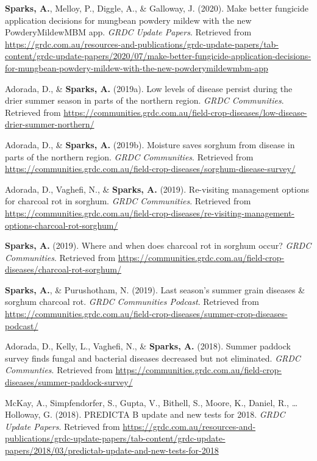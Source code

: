 \documentclass[11pt, a4paper]{awesome-cv}
\begin{document}
\leavevmode\hypertarget{ref-Sparks2020}{}%
\textbf{Sparks, A.}, Melloy, P., Diggle, A., \& Galloway, J. (2020).
Make better fungicide application decisions for mungbean powdery mildew
with the new {PowderyMildewMBM} app. \emph{{GRDC} Update Papers}.
Retrieved from
\url{https://grdc.com.au/resources-and-publications/grdc-update-papers/tab-content/grdc-update-papers/2020/07/make-better-fungicide-application-decisions-for-mungbean-powdery-mildew-with-the-new-powderymildewmbm-app}

\leavevmode\hypertarget{ref-Adorada2019a}{}%
Adorada, D., \& \textbf{Sparks, A.} (2019a). Low levels of disease
persist during the drier summer season in parts of the northern region.
\emph{GRDC Communities}. Retrieved from
\url{https://communities.grdc.com.au/field-crop-diseases/low-disease-drier-summer-northern/}

\leavevmode\hypertarget{ref-Adorada2019b}{}%
Adorada, D., \& \textbf{Sparks, A.} (2019b). Moisture saves sorghum from
disease in parts of the northern region. \emph{GRDC Communities}.
Retrieved from
\url{https://communities.grdc.com.au/field-crop-diseases/sorghum-disease-survey/}

\leavevmode\hypertarget{ref-Adorada2019c}{}%
Adorada, D., Vaghefi, N., \& \textbf{Sparks, A.} (2019). Re-visiting
management options for charcoal rot in sorghum. \emph{GRDC Communities}.
Retrieved from
\url{https://communities.grdc.com.au/field-crop-diseases/re-visiting-management-options-charcoal-rot-sorghum/}

\leavevmode\hypertarget{ref-Sparks2019a}{}%
\textbf{Sparks, A.} (2019). Where and when does charcoal rot in sorghum
occur? \emph{GRDC Communities}. Retrieved from
\url{https://communities.grdc.com.au/field-crop-diseases/charcoal-rot-sorghum/}

\leavevmode\hypertarget{ref-Sparks2019b}{}%
\textbf{Sparks, A.}, \& Purushotham, N. (2019). Last season's summer
grain diseases \& sorghum charcoal rot. \emph{GRDC Communities Podcast}.
Retrieved from
\url{https://communities.grdc.com.au/field-crop-diseases/summer-crop-diseases-podcast/}

\leavevmode\hypertarget{ref-Adorada2019d}{}%
Adorada, D., Kelly, L., Vaghefi, N., \& \textbf{Sparks, A.} (2018).
Summer paddock survey finds fungal and bacterial diseases decreased but
not eliminated. \emph{GRDC Communties}. Retrieved from
\url{https://communities.grdc.com.au/field-crop-diseases/summer-paddock-survey/}

\leavevmode\hypertarget{ref-McKay2018}{}%
McKay, A., Simpfendorfer, S., Gupta, V., Bithell, S., Moore, K., Daniel,
R., \ldots{} Holloway, G. (2018). {PREDICTA{{}} B} update and new tests
for 2018. \emph{GRDC Update Papers}. Retrieved from
\url{https://grdc.com.au/resources-and-publications/grdc-update-papers/tab-content/grdc-update-papers/2018/03/predictab-update-and-new-tests-for-2018}
\end{document}
